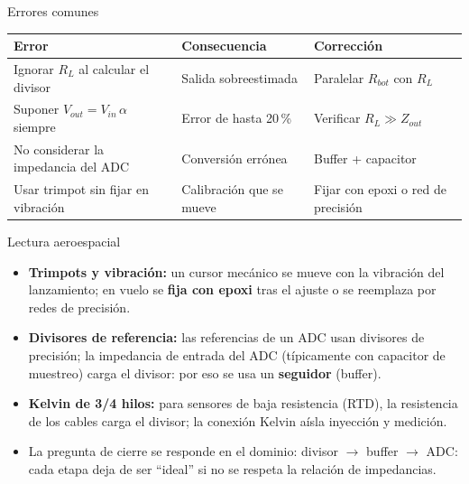 \documentclass[aspectratio=169]{beamer}
\begin{document}
  \begin{frame}{Errores comunes}
  \begin{table}
    \small
    \begin{tabular}{p{}p{}p{}}
      \toprule
      Error & Consecuencia & Corrección \\
      \midrule
      Ignorar $R_L$ al calcular el divisor & Salida sobreestimada & Paralelar $R_{bot}$ con $R_L$ \\
      Suponer $V_{out} = V_{in}\,\alpha$ siempre & Error de hasta 20\,\% & Verificar $R_L \gg Z_{out}$ \\
      No considerar la impedancia del ADC & Conversión errónea & Buffer + capacitor \\
      Usar trimpot sin fijar en vibración & Calibración que se mueve & Fijar con epoxi o red de precisión \\
      \bottomrule
    \end{tabular}
  \end{table}
\end{frame}

\begin{frame}{Lectura aeroespacial}
  \begin{itemize}
    \item \textbf{Trimpots y vibración:} un cursor mecánico se mueve con la
      vibración del lanzamiento; en vuelo se \textbf{fija con epoxi} tras el ajuste
      o se reemplaza por redes de precisión.
    \item \textbf{Divisores de referencia:} las referencias de un ADC usan divisores
      de precisión; la impedancia de entrada del ADC (típicamente con capacitor de
      muestreo) carga el divisor: por eso se usa un \textbf{seguidor} (buffer).
    \item \textbf{Kelvin de 3/4 hilos:} para sensores de baja resistencia (RTD),
      la resistencia de los cables carga el divisor; la conexión Kelvin aísla
      inyección y medición.
    \item La pregunta de cierre se responde en el dominio: divisor $\rightarrow$
      buffer $\rightarrow$ ADC: cada etapa deja de ser ``ideal'' si no se respeta
      la relación de impedancias.
  \end{itemize}
\end{frame}
\end{document}
